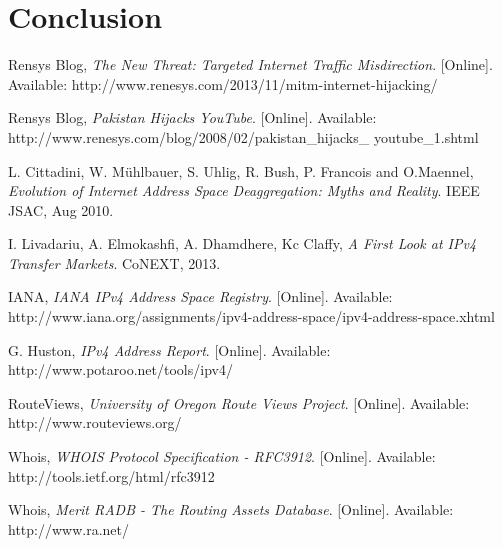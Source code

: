 \documentclass[11pt]{report}
\begin{document}
\section{Conclusion}

\renewcommand\bibname{\section{References}}
\begin{thebibliography}{count}

    Rensys Blog,
    \emph{The New Threat: Targeted Internet Traffic Misdirection}.
    [Online]. Available: http://www.renesys.com/2013/11/mitm-internet-hijacking/


    Rensys Blog,
    \emph{Pakistan Hijacks YouTube}.
    [Online]. Available: http://www.renesys.com/blog/2008/02/pakistan\_hijacks\_
youtube\_1.shtml

	L. Cittadini, W. Mühlbauer, S. Uhlig, R. Bush, P. Francois and O.Maennel,
	\emph{Evolution of Internet Address Space Deaggregation: Myths and Reality}.
	IEEE JSAC, Aug 2010.
	
	I. Livadariu, A. Elmokashfi, A. Dhamdhere, Kc Claffy,
	\emph{A First Look at IPv4 Transfer Markets}.
	CoNEXT, 2013.
	
	IANA,
	\emph{IANA IPv4 Address Space Registry}.
	[Online]. Available: http://www.iana.org/assignments/ipv4-address-space/ipv4-address-space.xhtml
	
	G. Huston,
	\emph{IPv4 Address Report}.
	[Online]. Available: http://www.potaroo.net/tools/ipv4/

	RouteViews,
	\emph{University of Oregon Route Views Project}.
	[Online]. Available: http://www.routeviews.org/
	
	Whois,
	\emph{WHOIS Protocol Specification - RFC3912}.
	[Online]. Available: http://tools.ietf.org/html/rfc3912

	Whois,
	\emph{Merit RADB - The Routing Assets Database}.
	[Online]. Available: http://www.ra.net/


\end{thebibliography}	
\end{document}
